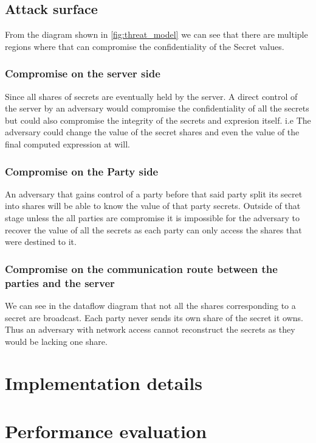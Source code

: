 \documentclass[10pt,conference,compsocconf]{IEEEtran}
\begin{document}
\subsection{Attack surface}
From the diagram shown in \ref{fig:threat_model} we can see that there are multiple regions where that can compromise
the confidentiality of the Secret values.
\subsubsection{Compromise on the server side}
Since all shares of secrets are eventually held by the server.
A direct control of the server by an adversary would compromise the confidentiality of all the secrets but could also
compromise the integrity of the secrets and expresion itself.
i.e The adversary could change the value of the secret
shares and even the value of the final computed expression at will.

\subsubsection{Compromise on the Party side}
An adversary that gains control of a party before that said party split its secret into shares will be able
to know the value of that party secrets.
Outside of that stage unless the all parties are compromise it is impossible for the adversary to recover
the value of all the secrets as each party can only access the shares that were destined to it.

\subsubsection{Compromise on the communication route between the parties and the server}
We can see in the dataflow diagram that not all the shares corresponding to a secret are broadcast.
Each party never sends its own share of the secret it owns.
Thus an adversary with network access cannot reconstruct the secrets as they would be lacking one share.


\section{Implementation details}


\section{Performance evaluation}
\end{document}
